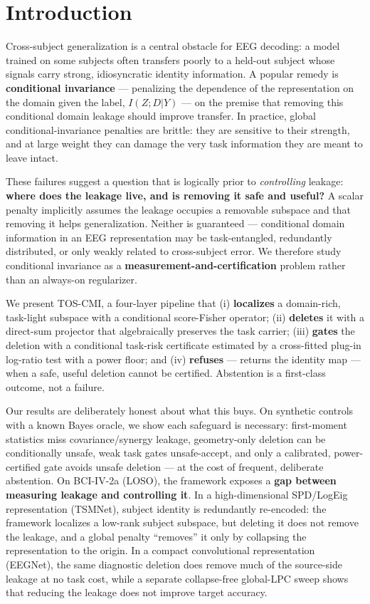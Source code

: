 \section{Introduction}

Cross-subject generalization is a central obstacle for EEG decoding: a model trained on some subjects often
transfers poorly to a held-out subject whose signals carry strong, idiosyncratic identity information.
A popular remedy is \textbf{conditional invariance} --- penalizing the dependence of the representation on the
domain given the label, $I(Z;D|Y)$ --- on the premise that removing this conditional domain leakage should
improve transfer. In practice, global conditional-invariance penalties are brittle: they are sensitive to
their strength, and at large weight they can damage the very task information they are meant to leave intact.

These failures suggest a question that is logically prior to \emph{controlling} leakage: \textbf{where does the leakage
live, and is removing it safe and useful?} A scalar penalty implicitly assumes the leakage occupies a
removable subspace and that removing it helps generalization. Neither is guaranteed --- conditional domain
information in an EEG representation may be task-entangled, redundantly distributed, or only weakly related
to cross-subject error. We therefore study conditional invariance as a \textbf{measurement-and-certification}
problem rather than an always-on regularizer.

We present TOS-CMI, a four-layer pipeline that (i) \textbf{localizes} a domain-rich, task-light subspace with a
conditional score-Fisher operator; (ii) \textbf{deletes} it with a direct-sum projector that algebraically
preserves the task carrier; (iii) \textbf{gates} the deletion with a conditional task-risk certificate estimated
by a cross-fitted plug-in log-ratio test with a power floor; and (iv) \textbf{refuses} --- returns the identity
map --- when a safe, useful deletion cannot be certified. Abstention is a first-class outcome, not a failure.

Our results are deliberately honest about what this buys. On synthetic controls with a known Bayes oracle,
we show each safeguard is necessary: first-moment statistics miss covariance/synergy leakage, geometry-only
deletion can be conditionally unsafe, weak task gates unsafe-accept, and only a calibrated, power-certified
gate avoids unsafe deletion --- at the cost of frequent, deliberate abstention. On BCI-IV-2a (LOSO), the
framework exposes a \textbf{gap between measuring leakage and controlling it}. In a high-dimensional SPD/LogEig
representation (TSMNet), subject identity is redundantly re-encoded: the framework localizes a low-rank
subject subspace, but deleting it does not remove the leakage, and a global penalty ``removes'' it only by
collapsing the representation to the origin. In a compact convolutional representation (EEGNet), the same diagnostic
deletion does remove much of the source-side leakage at no task cost, while a separate collapse-free global-LPC
sweep shows that reducing the leakage does not improve target accuracy.

